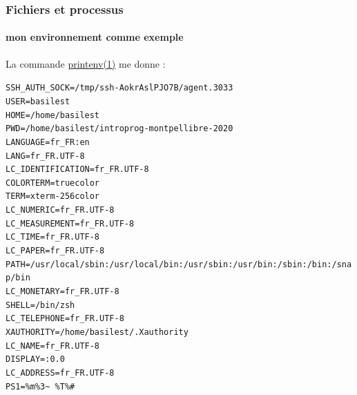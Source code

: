 \documentclass[xcolor=svgnames,final,smaller,a4]{beamer}
\begin{document}
\begin{frame}
  \frametitle{Fichiers et processus}
  \framesubtitle{mon environnement comme exemple}

La commande \href{https://man7.org/linux/man-pages/man1/printenv.1.html}{printenv(1)} me donne  :

\begin{relsize}{-1.8}
  \begin{alltt}
   SSH\_AUTH\_SOCK=/tmp/ssh-AokrAslPJO7B/agent.3033\\
   USER=basilest\\
   HOME=/home/basilest\\
   PWD=/home/basilest/introprog-montpellibre-2020\\
   LANGUAGE=fr\_FR:en\\
   LANG=fr\_FR.UTF-8\\
   LC\_IDENTIFICATION=fr\_FR.UTF-8\\
   COLORTERM=truecolor\\
  TERM=xterm-256color\\
  LC\_NUMERIC=fr\_FR.UTF-8\\
  LC\_MEASUREMENT=fr\_FR.UTF-8\\
  LC\_TIME=fr\_FR.UTF-8\\
  LC\_PAPER=fr\_FR.UTF-8\\
  PATH=/usr/local/sbin:/usr/local/bin:/usr/sbin:/usr/bin:/sbin:/bin:/snap/bin\\
  LC\_MONETARY=fr\_FR.UTF-8\\
  SHELL=/bin/zsh\\
  LC\_TELEPHONE=fr\_FR.UTF-8\\
  XAUTHORITY=/home/basilest/.Xauthority\\
  LC\_NAME=fr\_FR.UTF-8\\
  DISPLAY=:0.0\\
  LC\_ADDRESS=fr\_FR.UTF-8\\
  PS1=\%m \%3\~ ~ \%T \%\# 
  \end{alltt}
\end{relsize}
\end{frame}
\end{document}
